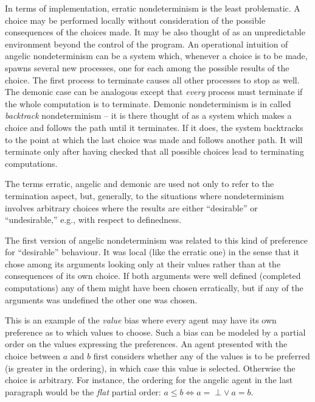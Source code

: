  
In terms of implementation, erratic nondeterminism is the least 
problematic. A choice may be performed locally without consideration 
of the possible consequences of the choices made. It may be also 
thought of as an unpredictable environment beyond the control 
of the program. An operational intuition of angelic 
nondeterminism \cite{c:25} can be a system which, whenever a choice 
is to be made, spawns several new processes, one for each among 
the possible results of the choice. The first process to terminate 
causes all other processes to stop as well. The demonic case can be 
analogous except that {\em every}
 process must terminate if the whole computation is to terminate. 
Demonic nondeterminism is in \cite{c:21} called {\em backtrack} 
nondeterminism  -- 
it is there thought of as a system which makes a choice and follows 
the path until it terminates. If it does, the system backtracks to 
the point at
 which the last choice was made and follows another path. It will 
terminate only after having checked that all possible choices lead to 
terminating computations.

 The terms erratic, angelic and demonic are used 
not only to refer to the termination aspect, but, generally, to the 
situations where nondeterminism involves arbitrary choices where the 
results are either ``desirable'' 
 or ``undesirable,''  e.g., with respect to 
definedness. 

 The first version of angelic nondeterminism 
\cite{c:84} was related to this kind of preference for ``desirable'' 
 behaviour. It was local (like the erratic one) in the sense that it 
chose among its arguments looking only at their values rather than at 
the consequences of its own choice. If both arguments were well 
defined (completed computations) any of them might have been chosen 
erratically, but if any of the 
arguments was undefined the other one was chosen. 

 This is an example of the {\em value} bias 
\cite{c:110} where every agent may have its own preference as to which 
values to choose. Such a bias can be modeled 
by a partial order on the values expressing the preferences. An 
agent presented with the choice between $a$ and $b$
 first considers whether any of the values is to be preferred (is 
greater in the ordering), in which case this value is selected. 
Otherwise the choice is arbitrary. For instance, the ordering for the 
angelic agent in the last paragraph would be the {\em 
flat} partial order: $a\leq  b \iff a=\perp \lor\ a=b$.

